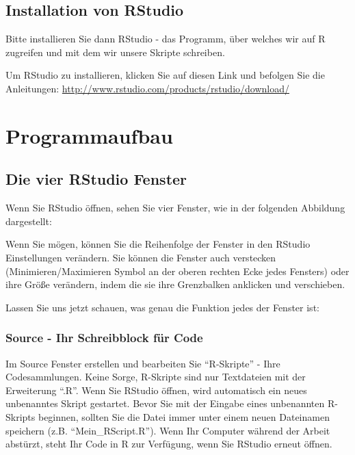 \documentclass[
]{book}
\begin{document}
\hypertarget{installation-von-rstudio}{%
\section{Installation von RStudio}\label{installation-von-rstudio}}

Bitte installieren Sie dann RStudio - das Programm, über welches wir auf R zugreifen und mit dem wir unsere Skripte schreiben.

Um RStudio zu installieren, klicken Sie auf diesen Link und befolgen Sie die Anleitungen: \url{http://www.rstudio.com/products/rstudio/download/}

\hypertarget{programmaufbau}{%
\chapter{Programmaufbau}\label{programmaufbau}}

\hypertarget{die-vier-rstudio-fenster}{%
\section{Die vier RStudio Fenster}\label{die-vier-rstudio-fenster}}

Wenn Sie RStudio öffnen, sehen Sie vier Fenster, wie in der folgenden Abbildung dargestellt:

Wenn Sie mögen, können Sie die Reihenfolge der Fenster in den RStudio Einstellungen verändern.
Sie können die Fenster auch verstecken (Minimieren/Maximieren Symbol an der oberen rechten Ecke jedes Fensters) oder ihre Größe verändern, indem die sie ihre Grenzbalken anklicken und verschieben.

Lassen Sie uns jetzt schauen, was genau die Funktion jedes der Fenster ist:

\hypertarget{source---ihr-schreibblock-fuxfcr-code}{%
\subsection{Source - Ihr Schreibblock für Code}\label{source---ihr-schreibblock-fuxfcr-code}}

Im Source Fenster erstellen und bearbeiten Sie ``R-Skripte'' - Ihre Codesammlungen. Keine Sorge, R-Skripte sind nur Textdateien mit der Erweiterung ``.R''.
Wenn Sie RStudio öffnen, wird automatisch ein neues unbenanntes Skript gestartet.
Bevor Sie mit der Eingabe eines unbenannten R-Skripts beginnen, sollten Sie die Datei immer unter einem neuen Dateinamen speichern (z.B. ``Mein\_RScript.R'').
Wenn Ihr Computer während der Arbeit abstürzt, steht Ihr Code in R zur Verfügung, wenn Sie RStudio erneut öffnen.
\end{document}

